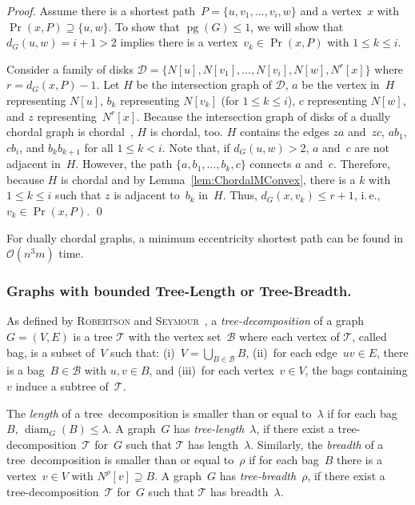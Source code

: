 \documentclass[10pt]{llncs}
\makeatletter
\newcommand{\calB}{\mathcal{B}}
\newcommand{\calD}{\mathcal{D}}
\newcommand{\calO}{\mathcal{O}}
\newcommand{\calT}{\mathcal{T}}
\newcommand{\ie}{i.\,e.\@ifnextchar{,}{}{~}}
\DeclareMathOperator{\pg}{pg}
\DeclareMathOperator{\diam}{diam}
\makeatother
\begin{document}
\begin{proof}
Assume there is a shortest path~$P = \{ u, v_1, \ldots, v_i , w \}$ and a vertex~$x$ with $\Pr(x, P) \supseteq \{ u, w \}$.
To show that $\pg(G) \leq 1$, we will show that $d_G(u, w) = i + 1 > 2$ implies there is a vertex~$v_k \in \Pr(x, P)$ with $1 \leq k \leq i$.

Consider a family of disks $\calD = \big \{ N[u], N[v_{1}], \ldots, N[v_{i}], N[w], N^r[x]  \big \}$ where $r = d_G(x, P) - 1$.
Let $H$ be the intersection graph of $\calD$, $a$ be the vertex in~$H$ representing $N[u]$, $b_k$ representing $N[v_{k}]$ (for $1 \leq k \leq i$), $c$ representing $N[w]$, and $z$ representing~$N^r[x]$.
Because the intersection graph of disks of a dually chordal graph is chordal~\cite{BraDraCheVol1998}, $H$ is chordal, too.
$H$ contains the edges $za$ and~$zc$, $ab_1$, $cb_i$, and $b_kb_{k+1}$ for all $1 \leq k < i$.
Note that, if $d_G(u, w) > 2$, $a$ and~$c$ are not adjacent in~$H$.
However, the path $\{ a, b_1, \ldots, b_k, c \}$ connects $a$ and~$c$.
Therefore, because $H$ is chordal and by Lemma~\ref{lem:ChordalMConvex}, there is a $k$ with $1 \leq k \leq i$ such that $z$ is adjacent to~$b_k$ in~$H$.
Thus, $d_G(x, v_k) \leq r + 1$, \ie, $v_k \in \Pr(x, P)$.
\qed
\end{proof}

\begin{corollary}
For dually chordal graphs, a minimum eccentricity shortest path can be found in $\calO(n^3m)$ time.
\end{corollary}

\subsubsection{Graphs with bounded Tree-Length or Tree-Breadth.}

As defined by \textsc{Robertson} and \textsc{Seymour}~\cite{RobertSeymou1986}, a \emph{tree-decomposition} of a graph $G = (V, E)$ is a tree $\calT$ with the vertex set~$\calB$ where each vertex of $\calT$, called bag, is a subset of~$V$ such that:
(i)~$V = \bigcup_{B \in \calB} B$, (ii)~for each edge~$uv \in E$, there is a bag~$B \in \calB$ with $u,v \in B$, and (iii)~for each vertex~$v \in V$, the bags containing $v$ induce a subtree of~$\calT$.

The \emph{length} of a tree~decomposition is smaller than or equal to~$\lambda$ if for each bag~$B$, $\diam_G(B) \leq \lambda$.
A graph~$G$ has \emph{tree-length}~$\lambda$, if there exist a tree-decomposition~$\calT$ for~$G$ such that $\calT$ has length~$\lambda$.
Similarly, the \emph{breadth} of a tree~decomposition is smaller than or equal to~$\rho$ if for each bag~$B$ there is a vertex~$v \in V$ with $N^\rho[v] \supseteq B$.
A graph~$G$ has \emph{tree-breadth}~$\rho$, if there exist a tree-decomposition~$\calT$ for~$G$ such that $\calT$ has breadth~$\lambda$.
\end{document}
